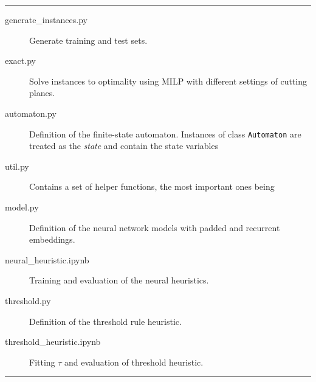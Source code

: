 \documentclass[a4paper]{article}
\theoremstyle{definition}
\theoremstyle{plain}
\begin{document}
\vspace{1em}
\hrule
\begin{description}
  \item[generate\_instances.py] Generate training and test sets.
  \item[exact.py] Solve instances to optimality using MILP with different settings of cutting planes.
  \item[automaton.py] Definition of the finite-state automaton. Instances of class \texttt{Automaton} are treated as the \textit{state} and contain the state variables
  \item[util.py] Contains a set of helper functions, the most important ones being
  \item[model.py] Definition of the neural network models with padded and recurrent embeddings.
  \item[neural\_heuristic.ipynb] Training and evaluation of the neural heuristics.
  \item[threshold.py] Definition of the threshold rule heuristic.
  \item[threshold\_heuristic.ipynb] Fitting $\tau$ and evaluation of threshold heuristic.
\end{description}
\hrule
\end{document}
